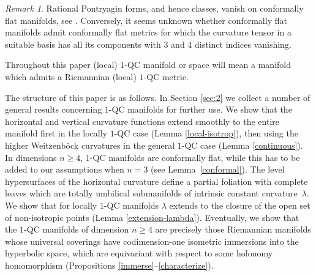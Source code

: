 \documentclass[10pt]{amsart}
\theoremstyle{definition}
\theoremstyle{remark}
\newtheorem{remark}[theorem]{Remark}
\numberwithin{equation}{section}
\begin{document}
\begin{remark}
Rational Pontryagin forms, and hence classes,
vanish on conformally flat manifolds, see \cite{CS,Kul2}.
Conversely, it seems unknown whether conformally flat
manifolds admit conformally flat metrics for which the
curvature tensor in a suitable basis has all its components with
$3$ and $4$ distinct indices vanishing.
\end{remark}

Throughout this paper (local) $1$-QC manifold or space
will mean a manifold which admits a Riemannian
(local) $1$-QC metric.

The structure of this paper is as follows. In Section \ref{sec:2} we collect a number of general results concerning
$1$-QC manifolds for further use. We show that the horizontal and vertical curvature functions extend smoothly
to the entire manifold first in the locally $1$-QC case (Lemma \ref{local-isotrop}), then using the higher Weitzenböck curvatures in the general
$1$-QC case (Lemma \ref{continuous}). In dimensions $n\geq4$, $1$-QC manifolds are conformally flat, while this has to be added to our assumptions when $n=3$ (see Lemma~\ref{conformal}).
The level hypersurfaces of the horizontal curvature define a partial foliation with complete leaves which are
totally umbilical submanifolds of intrinsic constant curvature~$\lambda$. We show that for locally $1$-QC manifolds
$\lambda$ extends to the closure of the open set of non-isotropic points (Lemma \ref{extension-lambda}).
Eventually, we show that the $1$-QC manifolds of dimension $n\geq4$ are precisely those Riemannian
manifolds whose universal coverings have codimension-one isometric immersions into the hyperbolic space, which are
equivariant with respect to some holonomy homomorphism (Propositions \ref{immerse}--\ref{characterize}).
\end{document}
